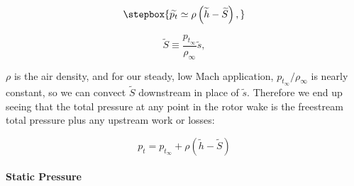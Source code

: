 %

\begin{equation}
   \label{eqn:totalpressure1}
   \stepbox{
    \widetilde{p_t} \simeq \rho \left(\widetilde{h}-\widetilde{S} \right),
}
\end{equation}

\where

\begin{equation}
    \widetilde{S} \equiv \frac{p_{t_\infty}}{\rho_\infty} \widetilde{s},
\end{equation}


\where \(\rho\) is the air density, and for our steady, low Mach application, \(p_{t_\infty}/\rho_\infty\) is nearly constant, so we can convect \(\widetilde{S}\) downstream in place of \(\widetilde{s}\).
%
Therefore we end up seeing that the total pressure at any point in the rotor wake is the freestream total pressure plus any upstream work or losses:

\begin{equation}
    \label{eqn:totalpressure}
    p_t = p_{t_\infty} + \rho \left(\widetilde{h}-\widetilde{S} \right)
\end{equation}


\paragraph{Static Pressure}
\label{sssec:staticpressure}

